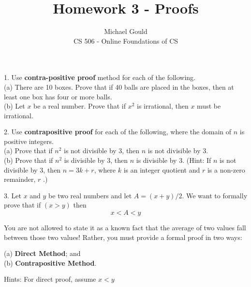 \documentclass[10pt]{article}
\begin{document}
\title{Homework 3 - Proofs}
\author{Michael Gould\\ 
CS 506 - Online Foundations of CS}

\maketitle

1. Use \textbf{contra-positive proof} method for each of the following.\\
(a) There are 10 boxes.  Prove that if 40 balls are placed in the boxes, then at least one box has four or more balls.\\
(b) Let $x$ be a real number.  Prove that if $x^2$ is irrational, then $x$ must be irrational.

2. Use \textbf{contrapositive proof} for each of the following, where the domain of $n$ is positive integers.\\
(a) Prove that if $n^2$ is not divisible by 3, then $n$ is not divisible by 3.\\
(b) Prove that if $n^2$ is divisible by 3, then $n$ is divisible by 3. (Hint: If $n$ is not divisible by 3, then $n = 3k +r$, where $k$ is an integer quotient and $r$ is a non-zero remainder, $r$ .)

3. Let $x$ and $y$ be two real numbers and let $A = (x + y)/2$.  We want to formally prove that if $(x > y)$ then
$$x < A < y$$

You are not allowed to state it as a known fact that the average of two values fall between those two values!  Rather, you must provide a formal proof in two ways:

(a) \textbf{Direct Method}; and\\
(b) \textbf{Contrapositive Method}.

Hints: For direct proof, assume $x < y$
\end{document}
